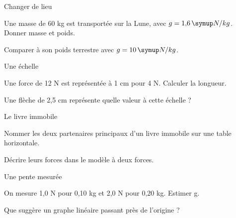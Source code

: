 \par\noindent\begin{minipage}{\linewidth}
\begin{exercice}[2]{Changer de lieu}
\begin{questions}
\item Une masse de 60 kg est transportée sur la Lune, avec $g=1{,}6\unite{N/kg}$. Donner masse et poids.
\item Comparer à son poids terrestre avec $g=10\unite{N/kg}$.
\end{questions}
\end{exercice}
\end{minipage}
\par\noindent\begin{minipage}{\linewidth}
\begin{exercice}[2]{Une échelle}
\begin{questions}
\item Une force de 12 N est représentée à 1 cm pour 4 N. Calculer la longueur.
\item Une flèche de 2,5 cm représente quelle valeur à cette échelle ?
\end{questions}
\end{exercice}
\end{minipage}
\par\noindent\begin{minipage}{\linewidth}
\begin{exercice}[2]{Le livre immobile}
\begin{questions}
\item Nommer les deux partenaires principaux d’un livre immobile sur une table horizontale.
\item Décrire leurs forces dans le modèle à deux forces.
\end{questions}
\end{exercice}
\end{minipage}
\clearpage{}
\par\noindent\begin{minipage}{\linewidth}
\begin{exercice}[3]{Une pente mesurée}
\begin{questions}
\item On mesure 1,0 N pour 0,10 kg et 2,0 N pour 0,20 kg. Estimer g.
\item Que suggère un graphe linéaire passant près de l’origine ?
\end{questions}
\end{exercice}
\end{minipage}
